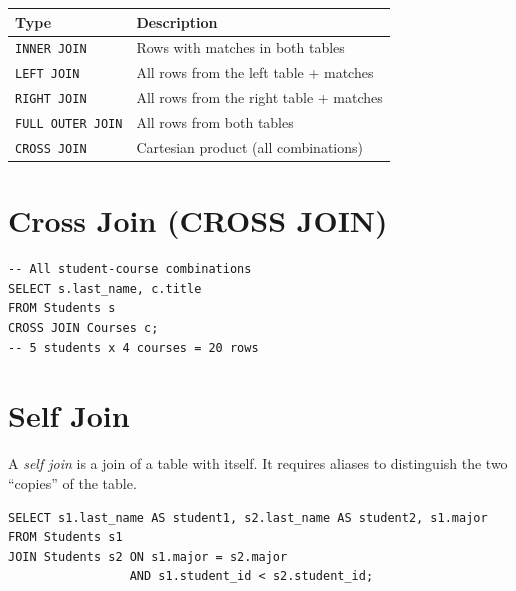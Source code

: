 \begin{keyformulas}[title=\textbf{Join Types Summary}]
\begin{center}
\begin{tabular}{lp{8cm}}
\toprule
\textbf{Type} & \textbf{Description} \\
\midrule
\texttt{INNER JOIN} & Rows with matches in both tables \\
\texttt{LEFT JOIN} & All rows from the left table + matches \\
\texttt{RIGHT JOIN} & All rows from the right table + matches \\
\texttt{FULL OUTER JOIN} & All rows from both tables \\
\texttt{CROSS JOIN} & Cartesian product (all combinations) \\
\bottomrule
\end{tabular}
\end{center}
\end{keyformulas}

\section{Cross Join (CROSS JOIN)}

\begin{codeblock}[title=\textbf{Cartesian Product}]
\begin{verbatim}
-- All student-course combinations
SELECT s.last_name, c.title
FROM Students s
CROSS JOIN Courses c;
-- 5 students x 4 courses = 20 rows
\end{verbatim}
\end{codeblock}

\section{Self Join}

\begin{definition}
A \emph{self join} is a join of a table with itself. It requires aliases
to distinguish the two ``copies'' of the table.
\end{definition}

\begin{codeblock}[title=\textbf{Finding Pairs of Students in the Same Major}]
\begin{verbatim}
SELECT s1.last_name AS student1, s2.last_name AS student2, s1.major
FROM Students s1
JOIN Students s2 ON s1.major = s2.major
                 AND s1.student_id < s2.student_id;
\end{verbatim}
\end{codeblock}

